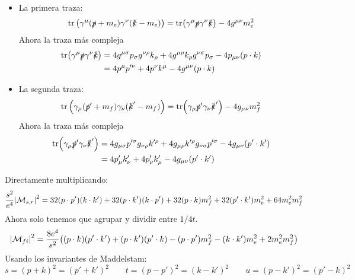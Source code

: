\begin{itemize}
	\item La primera traza:
	      \begin{equation}
		      \tr \pqty{\gamma^\mu (\pslash+m_e)\gamma^\nu (\kslash-m_e)} = \tr (\gamma^\mu \pslash \gamma^\nu \kslash) - 4g^{\mu \nu}m_e^2
	      \end{equation}
	      Ahora la traza más compleja
	      \begin{align}
		      \tr (\gamma^\mu \slashed{p} \gamma^\nu \slashed{k})
		       & = 4 g^{\mu \sigma} p_\sigma g^{\nu \rho} k_{\rho}
		      + 4 g^{\mu \rho} k_{\rho} g^{\nu \sigma} p_{\sigma}
		      - 4 p_{\mu \nu} (p \cdot k)                                                    \\
		       & = 4 p^\mu p^{\prime \nu} + 4 p^\nu k^{\mu} - 4 g^{\mu \nu} (p\cdot k)
	      \end{align}
	\item La segunda traza:
	      \begin{equation}
		      \tr \pqty{\gamma_\mu (\pslash'+m_f)\gamma_\nu (\kslash'-m_f)} = \tr (\gamma_\mu \pslash' \gamma_\nu \kslash') - 4g_{\mu \nu}m_f^2
	      \end{equation}
	      Ahora la traza más compleja
	      \begin{align}
		      \tr (\gamma_\mu \slashed{p}' \gamma_\nu \slashed{k}')
		       & = 4 g_{\mu \sigma} p^{\prime\sigma} g_{\nu \rho} k^{\prime \rho}
		      + 4 g_{\mu \rho} k^{\prime \rho} g_{\nu \sigma} p^{\prime \sigma}
		      - 4 g_{\mu \nu} (p' \cdot k')                                     \\
		       & = 4 p'_\mu k'_\nu + 4 p'_\nu k'_\mu - 4 g_{\mu \nu} (p'\cdot k')
	      \end{align}
\end{itemize}
Directamente  multiplicando:
\begin{equation}
	\frac{s^2}{e^4}\vqty{\Mcal_{s,r}}^2 = 32 (p\cdot p')(k\cdot k') + 32 (p \cdot k')(k\cdot p') + 32(p\cdot k)m_f^2 + 32(p'\cdot k')m_e^2 + 64 m_e^2 m_f^2
\end{equation}
Ahora solo tenemos que agrupar y dividir entre $1/4t$.
\begin{equation}
	\vqty{\Mcal_{fi}}^2 = \frac{8e^4}{s^2} \pqty{(p\cdot k)(p'\cdot k') +  (p \cdot k')(p'\cdot k)- (p\cdot p')m_f^2 - (k\cdot k')m_e^2 + 2 m_e^2 m_f^2}
\end{equation}
Usando los invariantes de Maddelstam:
\begin{equation}
	s = (p+k)^2 = (p'+k')^2 \qquad t = (p-p')^2 = (k-k')^2 \qquad u = (p-k')^2 = (p'-k)^2
\end{equation}
